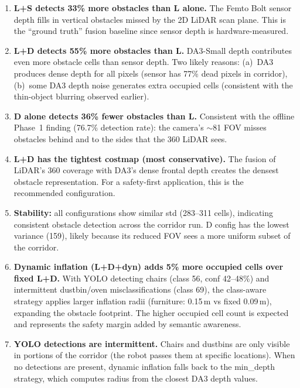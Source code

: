 \documentclass[11pt,a4paper]{article}
\begin{document}
\begin{enumerate}[nosep]
  \item \textbf{L+S detects 33\% more obstacles than L alone.}
    The Femto Bolt sensor depth fills in vertical obstacles missed by the
    2D LiDAR scan plane. This is the ``ground truth'' fusion baseline
    since sensor depth is hardware-measured.

  \item \textbf{L+D detects 55\% more obstacles than L.}
    DA3-Small depth contributes even more obstacle cells than sensor depth.
    Two likely reasons: (a)~DA3 produces dense depth for all pixels
    (sensor has 77\% dead pixels in corridor), (b)~some DA3 depth noise
    generates extra occupied cells (consistent with the thin-object blurring
    observed earlier).

  \item \textbf{D alone detects 36\% fewer obstacles than L.}
    Consistent with the offline Phase~1 finding (76.7\% detection rate):
    the camera's $\sim$81\textdegree{} FOV misses obstacles behind and
    to the sides that the 360\textdegree{} LiDAR sees.

  \item \textbf{L+D has the tightest costmap (most conservative).}
    The fusion of LiDAR's 360\textdegree{} coverage with DA3's dense
    frontal depth creates the densest obstacle representation. For a
    safety-first application, this is the recommended configuration.

  \item \textbf{Stability:} all configurations show similar std
    (283--311 cells), indicating consistent obstacle detection across
    the corridor run. D config has the lowest variance (159), likely
    because its reduced FOV sees a more uniform subset of the corridor.

  \item \textbf{Dynamic inflation (L+D+dyn) adds 5\% more occupied cells
    over fixed L+D.}  With YOLO detecting chairs (class 56, conf 42--48\%)
    and intermittent dustbin/oven misclassifications (class 69), the
    class-aware strategy applies larger inflation radii (furniture: 0.15\,m
    vs fixed 0.09\,m), expanding the obstacle footprint.  The higher
    occupied cell count is expected and represents the safety margin
    added by semantic awareness.

  \item \textbf{YOLO detections are intermittent.}  Chairs and dustbins
    are only visible in portions of the corridor (the robot passes them
    at specific locations).  When no detections are present, dynamic
    inflation falls back to the min\_depth strategy, which computes
    radius from the closest DA3 depth values.
\end{enumerate}
\end{document}
